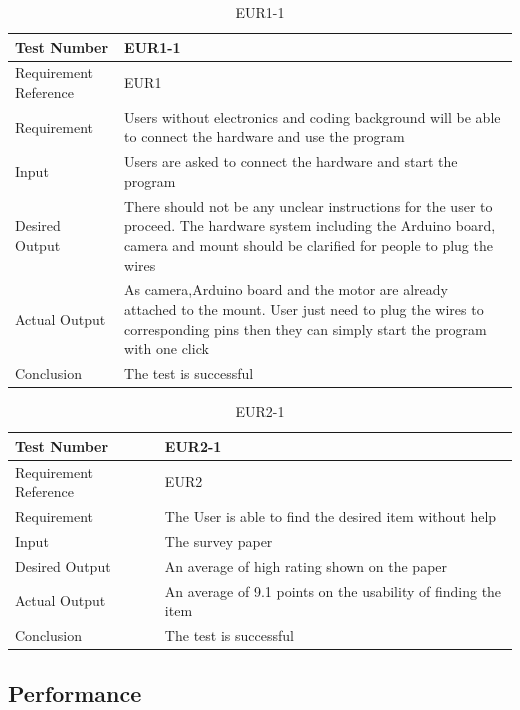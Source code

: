 \documentclass[12pt, titlepage]{article}
\begin{document}
\begin{table}[H]
\begin{center}
\begin{tabular}{|l | m{9cm}|}
\hline
  Test Number & EUR1-1\\
  \hline
  Requirement Reference & EUR1\\
  \hline
  Requirement &  Users without electronics and coding background will be able to connect the hardware and use the program\\
  \hline
  Input & Users are asked to connect the hardware and start the program\\
  \hline
  Desired Output & There should not be any unclear instructions for the user to proceed. The hardware system including the Arduino board, camera and mount should be clarified for people to plug the wires\\
  \hline
  Actual Output & As camera,Arduino board and the motor are already attached to the mount. User just need to plug the wires to corresponding pins then they can simply start the program with one click \\
  \hline
  Conclusion & The test is successful\\
  \hline
\end{tabular}
\end{center}  
\caption{EUR1-1}
\end{table}

\begin{table}[H]
\begin{center}
\begin{tabular}{|l | m{9cm}|}
\hline
  Test Number & EUR2-1\\
  \hline
  Requirement Reference & EUR2\\
  \hline
  Requirement & The User is able to find the desired item without help\\
  \hline
  Input & The survey paper\\
  \hline
  Desired Output & An average of high rating shown on the paper\\
  \hline
  Actual Output & An average of 9.1 points on the usability of finding the item\\
  \hline
  Conclusion & The test is successful\\
  \hline
\end{tabular}
\end{center}     
\caption{EUR2-1}
\end{table}
\subsection{Performance}
\end{document}
